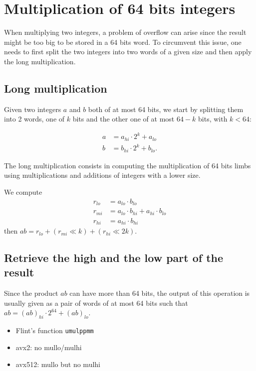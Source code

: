\documentclass[a4paper]{article}
\begin{document}
\section{Multiplication of 64 bits integers}

When multiplying two integers, a problem of overflow can arise since the result might be too big to be stored in a 64 bits word. 
To circumvent this issue, one needs to first split the two integers into two words of a given size and then apply the long multiplication.

\subsection{Long multiplication}
Given two integers $a$ and $b$ both of at most 64 bits, we start by splitting them into 2 words, one of $k$ bits and the other one of at most $64-k$ bits, with $k<64$:

\begin{align*}
    a &= a_{hi}\cdot 2^{k} + a_{lo} \\
    b &= b_{hi}\cdot 2^{k} + b_{lo}.
\end{align*}

The long multiplication consists in computing the multiplication of 64 bits limbs using multiplications and additions of integers with a lower size.

We compute
\begin{align*}
    r_{lo} &= a_{lo}\cdot b_{lo} \\
    r_{mi} &= a_{lo}\cdot b_{hi} + a_{hi}\cdot b_{lo} \\
    r_{hi} &= a_{hi}\cdot b_{hi}
\end{align*}
then $ab = r_{lo} + (r_{mi} \ll k) + (r_{hi} \ll 2k)$.


\subsection{Retrieve the high and the low part of the result}

Since the product $ab$ can have more than 64 bits, the output of this operation is usually given as a pair of words of at most 64 bits such that $ab = (ab)_{hi}\cdot 2^{64} + (ab)_{lo}$.

\begin{itemize}
    \item Flint's function \texttt{umulppmm}
    \item avx2: no mullo/mulhi
    \item avx512: mullo but no mulhi
\end{itemize} 
\end{document}

